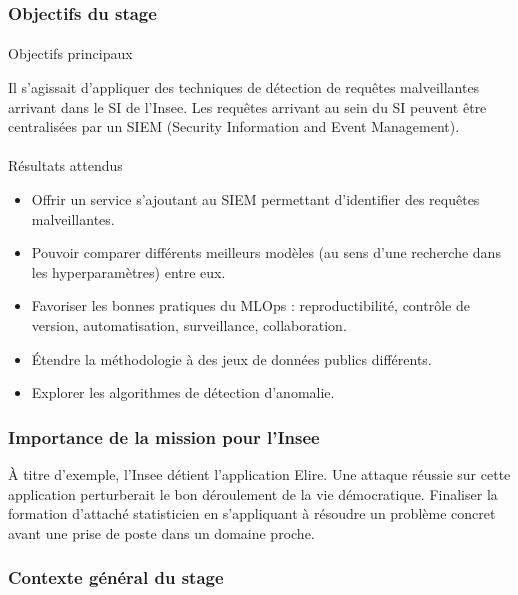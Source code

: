 \documentclass[
  letterpaper,
  DIV=11,
  numbers=noendperiod]{scrartcl}
\makeatletter
\let\oldparagraph\paragraph
\renewcommand{\paragraph}{
    \@ifstar
      \xxxParagraphStar
      \xxxParagraphNoStar
  }
\newcommand{\xxxParagraphStar}[1]{\oldparagraph*{#1}\mbox{}}
\newcommand{\xxxParagraphNoStar}[1]{\oldparagraph{#1}\mbox{}}
\providecommand{\tightlist}{%
  \setlength{\itemsep}{0pt}\setlength{\parskip}{0pt}}\usepackage{longtable,booktabs,array}
\makeatother
\begin{document}
\subsubsection{Objectifs du stage}\label{objectifs-du-stage}

\paragraph{Objectifs principaux}\label{objectifs-principaux}

Il s'agissait d'appliquer des techniques de détection de requêtes
malveillantes arrivant dans le SI de l'Insee. Les requêtes arrivant au
sein du SI peuvent être centralisées par un SIEM (Security Information
and Event Management).

\paragraph{Résultats attendus}\label{ruxe9sultats-attendus}

\begin{itemize}
\tightlist
\item
  Offrir un service s'ajoutant au SIEM permettant d'identifier des
  requêtes malveillantes.
\item
  Pouvoir comparer différents meilleurs modèles (au sens d'une recherche
  dans les hyperparamètres) entre eux.
\item
  Favoriser les bonnes pratiques du MLOps : reproductibilité, contrôle
  de version, automatisation, surveillance, collaboration.
\item
  Étendre la méthodologie à des jeux de données publics différents.
\item
  Explorer les algorithmes de détection d'anomalie.
\end{itemize}

\subsubsection{Importance de la mission pour
l'Insee}\label{importance-de-la-mission-pour-linsee}

À titre d'exemple, l'Insee détient l'application Elire. Une attaque
réussie sur cette application perturberait le bon déroulement de la vie
démocratique. Finaliser la formation d'attaché statisticien en
s'appliquant à résoudre un problème concret avant une prise de poste
dans un domaine proche.

\subsubsection{Contexte général du
stage}\label{contexte-guxe9nuxe9ral-du-stage-1}
\end{document}
